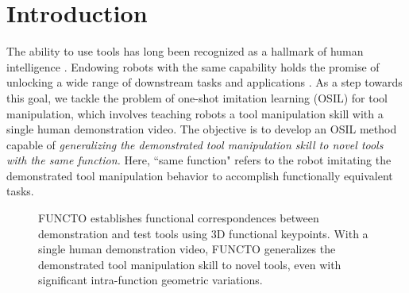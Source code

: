 \section{Introduction}




The ability to use tools has long been recognized as a hallmark of human intelligence \cite{washburn1960tools}. 
Endowing robots with the same capability holds the promise of unlocking a wide range of downstream tasks and applications \cite{chi2023diffusion, finn2017one, vitiello2023one}. As a step towards this goal, we tackle the problem of one-shot imitation learning (OSIL) for tool manipulation, which involves teaching robots a tool manipulation skill with a single human demonstration video. The objective is to develop an OSIL method capable of \textit{generalizing the demonstrated tool manipulation skill to novel tools with the same function.} Here, ``same function" refers to the robot imitating the demonstrated tool manipulation behavior to accomplish functionally equivalent tasks.







\begin{figure}[th]
  \centering
  \vspace*{-0.1in}
    \vspace*{-0.3in}
  \caption{FUNCTO establishes functional correspondences between demonstration and test tools using 3D functional keypoints. With a single human demonstration video, FUNCTO generalizes the demonstrated tool manipulation skill to novel tools, even with significant intra-function geometric variations.}
  \label{fig:concept}
  \vspace*{-0.8cm}
\end{figure}

